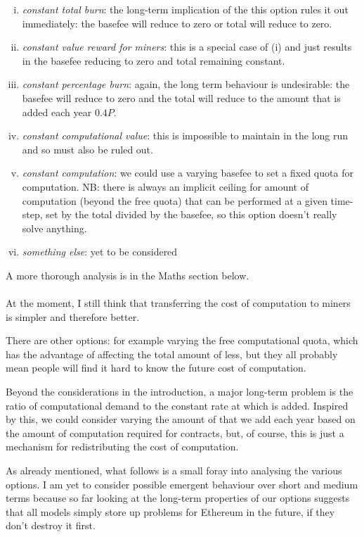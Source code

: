 \documentclass[11pt,a4paper]{article}
\begin{document}
\begin{enumerate}[i)] \itemsep=0pt
\item {\it constant total burn}: the long-term implication of the this option rules it out immediately: the basefee will reduce to zero or total \ether will reduce to zero. 
\item {\it constant value reward for miners}: this is a special case of (i) and just results in the basefee reducing to zero and total \ether remaining constant.
\item {\it constant percentage burn}: again, the long term behaviour is undesirable: the basefee will reduce to zero and the total \ether will reduce to the amount that is added each year $0.4P$.
\item {\it constant computational value}: this is impossible to maintain in the long run and so must also be ruled out.
\item {\it constant computation}: we could use a varying basefee to set a fixed quota for computation. NB: there is always an implicit ceiling for amount of computation (beyond the free quota) that can be performed at a given time-step, set by the total \ether divided by the basefee, so this option doesn't really solve anything.
\item {\it something else}: yet to be considered 
\end{enumerate}

A more thorough analysis is in the Maths section below.

\paragraph*{}
At the moment, I still think that transferring the cost of computation to miners is simpler and therefore better.

There are other options: for example varying the free computational quota, which has the advantage of affecting the total amount of \ether less, but they all probably mean people will find it hard to know the future cost of computation.

Beyond the considerations in the introduction, a major long-term problem is the ratio of computational demand to the constant rate at which \ether is added. Inspired by this, we could consider varying the amount of \ether that we add each year based on the amount of computation required for contracts, but, of course, this is just a mechanism for redistributing the cost of computation.

As already mentioned, what follows is a small foray into analysing the various options. I am yet to consider possible emergent behaviour over short and medium terms because so far looking at the long-term properties of our options suggests that all models simply store up problems for Ethereum in the future, if they don't destroy it first.
\end{document}
